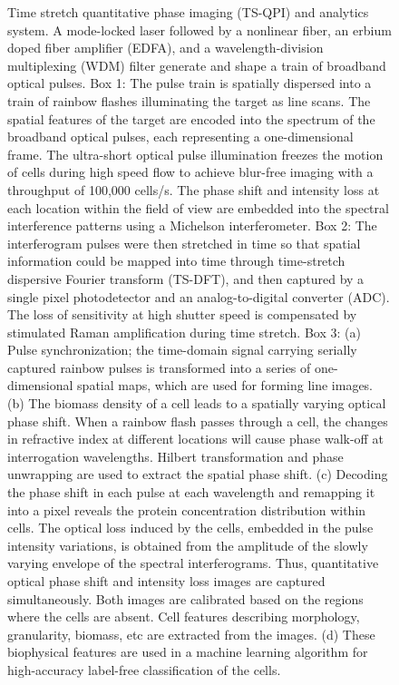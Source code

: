 \documentclass[aps,pra,reprint,superscriptaddress]{revtex4-1}
\begin{document}
\begin{figure}
\caption{\label{fig:Setup} Time stretch quantitative phase imaging (TS-QPI) and analytics system. A mode-locked laser followed by a nonlinear fiber, an erbium doped fiber amplifier (EDFA), and a wavelength-division multiplexing (WDM) filter generate and shape a train of broadband optical pulses. Box 1: The pulse train is spatially dispersed into a train of rainbow flashes illuminating the target as line scans. The spatial features of the target are encoded into the spectrum of the broadband optical pulses, each representing a one-dimensional frame. The ultra-short optical pulse illumination freezes the motion of cells during high speed flow to achieve blur-free imaging with a throughput of 100,000 cells/s. The phase shift and intensity loss at each location within the field of view are embedded into the spectral interference patterns using a Michelson interferometer. Box 2: The interferogram pulses were then stretched in time so that spatial information could be mapped into time through time-stretch dispersive Fourier transform (TS-DFT), and then captured by a single pixel photodetector and an analog-to-digital converter (ADC). The loss of sensitivity at high shutter speed is compensated by stimulated Raman amplification during time stretch. Box 3: (a) Pulse synchronization; the time-domain signal carrying serially captured rainbow pulses is transformed into a series of one-dimensional spatial maps, which are used for forming line images. (b) The biomass density of a cell leads to a spatially varying optical phase shift. When a rainbow flash passes through a cell, the changes in refractive index at different locations will cause phase walk-off at interrogation wavelengths. Hilbert transformation and phase unwrapping are used to extract the spatial phase shift. (c) Decoding the phase shift in each pulse at each wavelength and remapping it into a pixel reveals the protein concentration distribution within cells. The optical loss induced by the cells, embedded in the pulse intensity variations, is obtained from the amplitude of the slowly varying envelope of the spectral interferograms. Thus, quantitative optical phase shift and intensity loss images are captured simultaneously. Both images are calibrated based on the regions where the cells are absent. Cell features describing morphology, granularity, biomass, etc are extracted from the images. (d) These biophysical features are used in a machine learning algorithm for high-accuracy label-free classification of the cells.}
\end{figure}
\end{document}
